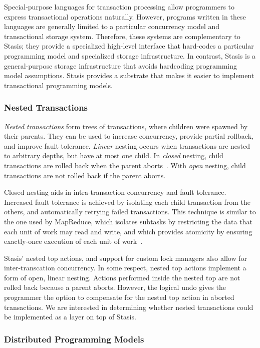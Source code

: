 \documentclass[letterpaper,twocolumn,10pt]{article}
\newcommand{\yad}{Stasis\xspace}
\newcommand{\yads}{Stasis'\xspace}
\begin{document}
Special-purpose languages for transaction processing allow programmers
to express transactional operations naturally.  However, programs
written in these languages are generally limited to a particular
concurrency model and transactional storage system.  Therefore, these
systems are complementary to \yad; they provide a specialized
high-level interface that hard-codes a particular programming model
and specialized storage infrastructure.  In contrast, \yad is a
general-purpose storage infrastructure that avoids hardcoding
programming model assumptions.  \yad provides a substrate that makes
it easier to implement transactional programming models.

\subsubsection{Nested Transactions}

{\em Nested transactions} form trees of transactions, where children
were spawned by their parents.  They can be used to increase
concurrency, provide partial rollback, and improve fault tolerance.
{\em Linear} nesting occurs when transactions are nested to arbitrary
depths, but have at most one child.  In {\em closed} nesting, child
transactions are rolled back when the parent
aborts~\cite{nestedTransactionBook}.  With {\em open} nesting, child
transactions are not rolled back if the parent aborts.  

Closed nesting aids in intra-transaction concurrency and fault
tolerance.  Increased fault tolerance is achieved by isolating each
child transaction from the others, and automatically retrying failed
transactions.  This technique is similar to the one used by MapReduce,
which isolates subtasks by restricting the data that each unit of work
may read and write, and which provides atomicity by ensuring
exactly-once execution of each unit of work~\cite{mapReduce}.

\yads nested top actions, and support for custom lock managers also
allow for inter-transcation concurrency.  In some respect, nested top
actions implement a form of open, linear nesting.  Actions performed
inside the nested top are not rolled back because a parent aborts.
However, the logical undo gives the programmer the option to
compensate for the nested top action in aborted transactions.  We are
interested in determining whether nested transactions
could be implemented as a layer on top of \yad.

\subsubsection{Distributed Programming Models}
\end{document}
